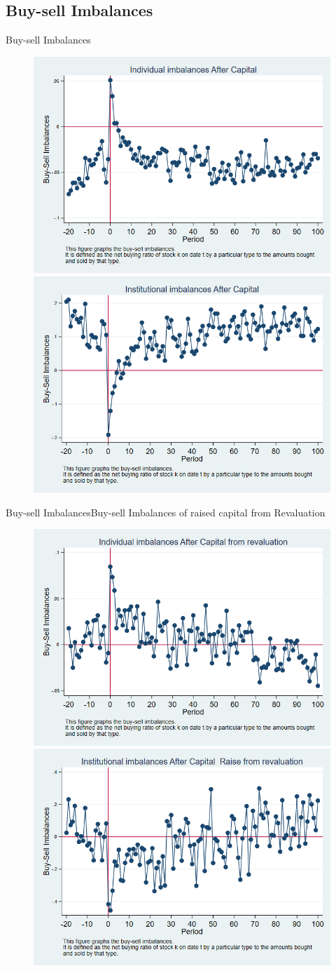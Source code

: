 \documentclass{beamer}
\begin{document}
\subsection{Buy-sell Imbalances}

\begin{frame}{Buy-sell Imbalances}
\begin{figure}
\centering
\includegraphics[width=0.45\linewidth]{IndImb}
\includegraphics[width=0.45\linewidth]{InsImb}
\label{fig:indimb}
\end{figure}
\end{frame}
\begin{frame}{Buy-sell Imbalances}{Buy-sell Imbalances of raised capital from Revaluation}
\begin{figure}
\centering
\includegraphics[width=0.45\linewidth]{IndImb_Revaluation}
\includegraphics[width=0.45\linewidth]{InsImb_Revaluation}
\label{fig:indimbrevaluation}
\end{figure}
\end{frame}
\end{document}
